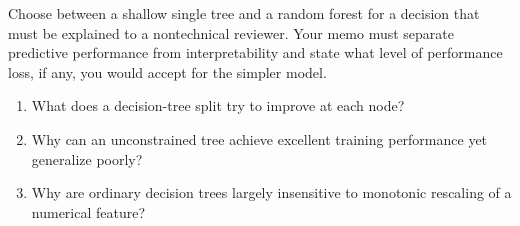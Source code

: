 \begin{decisionmemo}
Choose between a shallow single tree and a random forest for a decision that must be explained to a nontechnical reviewer. Your memo must separate predictive performance from interpretability and state what level of performance loss, if any, you would accept for the simpler model.
\end{decisionmemo}

\begin{quickcheck}
\begin{enumerate}
  \item What does a decision-tree split try to improve at each node?
  \item Why can an unconstrained tree achieve excellent training performance yet generalize poorly?
  \item Why are ordinary decision trees largely insensitive to monotonic rescaling of a numerical feature?
\end{enumerate}
\end{quickcheck}
